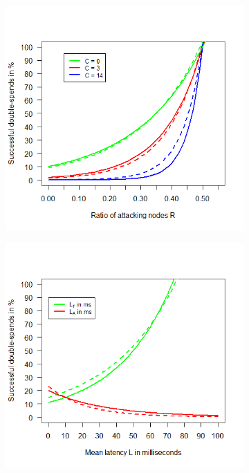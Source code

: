 \documentclass[a4paper,12pt,twoside]{report}
\begin{document}
\begin{figure}
\begin{subfigure}{.495\textwidth}
  \includegraphics[width=\linewidth]{Comparison/Confirmations/confrat.png}
\end{subfigure}
\begin{subfigure}{.495\textwidth}
  \centering
  \includegraphics[width=\linewidth]{Comparison/bothlat.png}
\end{subfigure}%

\end{figure}
\end{document}
